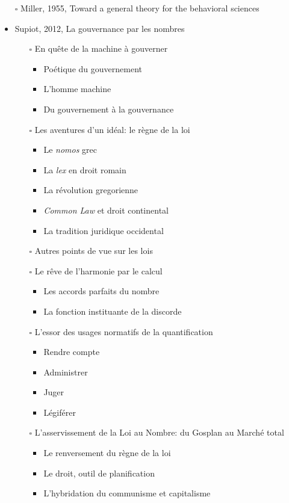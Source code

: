 \documentclass[paper=B6,portrait,twoside=true,twocolumn=false,headinclude=true,footinclude=false,fontsize=12,BCOR=10mm,DIV=calc,pagesize=auto,titlepage=firstiscover,mpinclude=false,headings=normal,headings=twolinechapter,open=right,toc=graduated,chapterprefix=false,numbers=endperiod,parskip=half+]{scrbook}
\theoremstyle{definition}
\begin{document}
\begin{itemize}
\item[{$\square$}] Miller, 1955, Toward a general theory for the behavioral sciences
\item\relax [0/15] Supiot, 2012, La gouvernance par les nombres
\begin{itemize}
\item[{$\square$}] En quête de la machine à gouverner
\begin{itemize}
\item Poétique du gouvernement
\item L'homme machine
\item Du gouvernement à la gouvernance
\end{itemize}
\item[{$\square$}] Les aventures d'un idéal: le règne de la loi
\begin{itemize}
\item Le \emph{nomos} grec
\item La \emph{lex} en droit romain
\item La révolution gregorienne
\item \emph{Common Law} et droit continental
\item La tradition juridique occidental
\end{itemize}
\item[{$\square$}] Autres points de vue sur les lois
\item[{$\square$}] Le rêve de l'harmonie par le calcul
\begin{itemize}
\item Les accords parfaits du nombre
\item La fonction instituante de la discorde
\end{itemize}
\item[{$\square$}] L'essor des usages normatifs de la quantification
\begin{itemize}
\item Rendre compte
\item Administrer
\item Juger
\item Légiférer
\end{itemize}
\item[{$\square$}] L’asservissement de la Loi au Nombre: du Gosplan au Marché total
\begin{itemize}
\item Le renversement du règne de la loi
\item Le droit, outil de planification
\item L'hybridation du communisme et capitalisme

\end{itemize}
\end{itemize}
\end{itemize}
\end{document}
